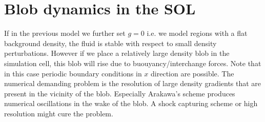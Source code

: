 \documentclass[a4paper,12pt]{scrartcl}
\begin{document}
\section{Blob dynamics in the SOL}
If in the previous model we further set $g=0$ i.e. we model regions with 
a flat background density, the fluid is stable with respect to small density 
perturbations. However if we place a relatively large density blob in the
simulation cell, this blob will rise due to buouyancy/interchange forces. 
Note that in this case periodic boundary conditions in $x$ direction are possible.
The numerical demanding problem is the resolution of large density gradients
that are present in the vicinity of the blob. Especially Arakawa's scheme produces
numerical oscillations in the wake of the blob. A shock capturing scheme or  
high resolution might cure the problem.
\end{document}
